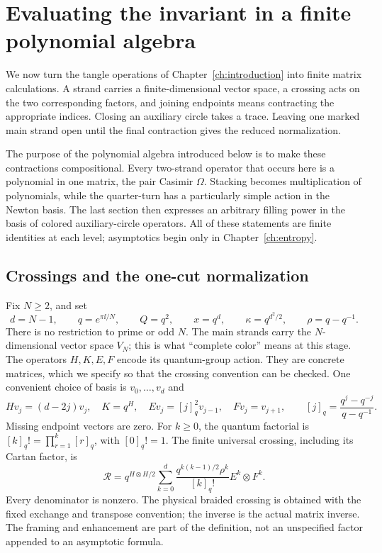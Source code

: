 \chapter{Evaluating the invariant in a finite polynomial algebra}\label{ch:source}

We now turn the tangle operations of Chapter~\ref{ch:introduction} into finite matrix calculations. A strand carries a finite-dimensional vector space, a crossing acts on the two corresponding factors, and joining endpoints means contracting the appropriate indices. Closing an auxiliary circle takes a trace. Leaving one marked main strand open until the final contraction gives the reduced normalization.

The purpose of the polynomial algebra introduced below is to make these contractions compositional. Every two-strand operator that occurs here is a polynomial in one matrix, the pair Casimir $\Omega$. Stacking becomes multiplication of polynomials, while the quarter-turn has a particularly simple action in the Newton basis. The last section then expresses an arbitrary filling power in the basis of colored auxiliary-circle operators. All of these statements are finite identities at each level; asymptotics begin only in Chapter~\ref{ch:entropy}.

\section{Crossings and the one-cut normalization}
Fix $N\ge2$, and set
\begin{equation}\label{eq:root-notation}
 d=N-1,\qquad q=e^{\pi\ii/N},\qquad Q=q^2,\qquad
 x=q^d,\qquad \kappa=q^{d^2/2},\qquad \rho=q-q^{-1}.
\end{equation}
There is no restriction to prime or odd $N$. The main strands carry the $N$-dimensional vector space $V_N$; this is what ``complete color'' means at this stage. The operators $H,K,E,F$ encode its quantum-group action. They are concrete matrices, which we specify so that the crossing convention can be checked. One convenient choice of basis is $v_0,\ldots,v_d$ and
\[
 H v_j=(d-2j)v_j,\quad K=q^H,\quad
 E v_j=[j]_q^2v_{j-1},\quad Fv_j=v_{j+1},
 \qquad [j]_q=\frac{q^j-q^{-j}}{q-q^{-1}}.
\]
Missing endpoint vectors are zero. For $k\ge0$, the quantum factorial is
$[k]_q!=\prod_{r=1}^k[r]_q$, with $[0]_q!=1$.
The finite universal crossing, including its Cartan factor, is
\begin{equation}\label{eq:universal-crossing}
 \mathscr R=q^{H\otimes H/2}
 \sum_{k=0}^{d}\frac{q^{k(k-1)/2}\rho^k}{[k]_q!}
 E^k\otimes F^k.
\end{equation}
Every denominator is nonzero. The physical braided crossing is obtained with the fixed exchange and transpose convention; the inverse is the actual matrix inverse. The framing and enhancement are part of the definition, not an unspecified factor appended to an asymptotic formula.

